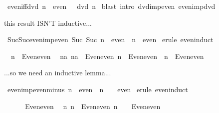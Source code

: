 \begin{isabellebody}
\isamarkuptrue%
\ even{\isacharunderscore}iff{\isacharunderscore}dvd{\isacharcolon}\ {\isachardoublequote}{\isacharparenleft}n\ {\isasymin}\ even{\isacharparenright}\ {\isacharequal}\ {\isacharparenleft}{}\ dvd\ n{\isacharparenright}{\isachardoublequote}\isanewline
\isamarkupfalse%
\ {\isacharparenleft}blast\ intro{\isacharcolon}\ dvd{\isacharunderscore}imp{\isacharunderscore}even\ even{\isacharunderscore}imp{\isacharunderscore}dvd{\isacharparenright}\isamarkupfalse%
%
\begin{isamarkuptext}%
this result ISN'T inductive...%
\end{isamarkuptext}%
\isamarkuptrue%
\ Suc{\isacharunderscore}Suc{\isacharunderscore}even{\isacharunderscore}imp{\isacharunderscore}even{\isacharcolon}\ {\isachardoublequote}Suc\ {\isacharparenleft}Suc\ n{\isacharparenright}\ {\isasymin}\ even\ {\isasymLongrightarrow}\ n\ {\isasymin}\ even{\isachardoublequote}\isanewline
\isamarkupfalse%
\ {\isacharparenleft}erule\ even{\isachardot}induct{\isacharparenright}\isamarkupfalse%
%
\begin{isamarkuptxt}%
\begin{isabelle}%
\ {}{\isachardot}\ n\ {\isasymin}\ Even{\isachardot}even\isanewline
\ {}{\isachardot}\ {\isasymAnd}na{\isachardot}\ {\isasymlbrakk}na\ {\isasymin}\ Even{\isachardot}even{\isacharsemicolon}\ n\ {\isasymin}\ Even{\isachardot}even{\isasymrbrakk}\ {\isasymLongrightarrow}\ n\ {\isasymin}\ Even{\isachardot}even%
\end{isabelle}%
\end{isamarkuptxt}%
\isamarkuptrue%
\isamarkupfalse%
%
\begin{isamarkuptext}%
...so we need an inductive lemma...%
\end{isamarkuptext}%
\isamarkuptrue%
\ even{\isacharunderscore}imp{\isacharunderscore}even{\isacharunderscore}minus{\isacharunderscore}{}{\isacharcolon}\ {\isachardoublequote}n\ {\isasymin}\ even\ {\isasymLongrightarrow}\ n\ {\isacharminus}\ {}\ {\isasymin}\ even{\isachardoublequote}\isanewline
\isamarkupfalse%
\ {\isacharparenleft}erule\ even{\isachardot}induct{\isacharparenright}\isamarkupfalse%
%
\begin{isamarkuptxt}%
\begin{isabelle}%
\ {}{\isachardot}\ {}\ {\isacharminus}\ {}\ {\isasymin}\ Even{\isachardot}even\isanewline
\ {}{\isachardot}\ {\isasymAnd}n{\isachardot}\ {\isasymlbrakk}n\ {\isasymin}\ Even{\isachardot}even{\isacharsemicolon}\ n\ {\isacharminus}\ {}\ {\isasymin}\ Even{\isachardot}even{\isasymrbrakk}\isanewline

\end{isabelle}
\end{isamarkuptxt}
\end{isabellebody}
